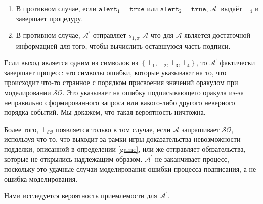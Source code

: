 \documentclass{mrl}
\theoremstyle{definition}
\numberwithin{theorem}{subsection}
\newcommand{\adversary}{\mathcal{A}}
\begin{document}
\begin{description}
\begin{description}
\begin{enumerate}
\item В противном случае, если $\texttt{alert}_1=\texttt{true}$ или $\texttt{alert}_2 = \texttt{true}$, $\adversary^\prime$ выдаёт $\bot_4$ и завершает процедуру.

\item В противном случае, $\adversary^\prime$ отправляет $s_{1, \pi}$ $\adversary$ что для $\adversary$ является достаточной информацией для того, чтобы вычислить оставшуюся часть подписи.


\end{enumerate}

\end{description}

\end{description}


Если выход является одним из символов из $\left\{\bot_1, \bot_2, \bot_3, \bot_4\right\}$, то $\adversary^\prime$ фактически завершает процесс: это символы ошибки, которые указывают на то, что происходит что-то странное с порядком присвоения значений оракулом при моделировании $\mathcal{SO}$. Это указывает на ошибку подписывающего оракула из-за неправильно сформированного запроса или какого-либо другого неверного порядка событий. Мы докажем, что такая вероятность ничтожна.

Более того, $\bot_{\mathcal{SO}}$ появляется только в том случае, если $\adversary$ запрашивает $\mathcal{SO}$, используя что-то, что выходит за рамки игры доказательства невозможности подделки, описанной в определении \ref{game}, или же отправляет обязательства, которые не открылись надлежащим образом. $\adversary^\prime$ не заканчивает процесс, поскольку это удачные случаи моделирования ошибки процесса подписания, а не ошибка моделирования.

Нами исследуется вероятность приемлемости для $\adversary^\prime$.
\end{document}
